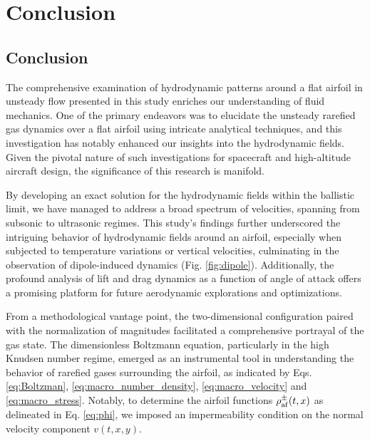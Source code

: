 \chapter{Conclusion}
\section{Conclusion}

The comprehensive examination of hydrodynamic patterns around a flat airfoil in unsteady flow presented in this study enriches our understanding of fluid mechanics. One of the primary endeavors was to elucidate the unsteady rarefied gas dynamics over a flat airfoil using intricate analytical techniques, and this investigation has notably enhanced our insights into the hydrodynamic fields. Given the pivotal nature of such investigations for spacecraft and high-altitude aircraft design, the significance of this research is manifold.

By developing an exact solution for the hydrodynamic fields within the ballistic limit, we have managed to address a broad spectrum of velocities, spanning from subsonic to ultrasonic regimes. This study's findings further underscored the intriguing behavior of hydrodynamic fields around an airfoil, especially when subjected to temperature variations or vertical velocities, culminating in the observation of dipole-induced dynamics (Fig. \ref{fig:dipole}). Additionally, the profound analysis of lift and drag dynamics as a function of angle of attack offers a promising platform for future aerodynamic explorations and optimizations.

From a methodological vantage point, the two-dimensional configuration paired with the normalization of magnitudes facilitated a comprehensive portrayal of the gas state. The dimensionless Boltzmann equation, particularly in the high Knudsen number regime, emerged as an instrumental tool in understanding the behavior of rarefied gases surrounding the airfoil, as indicated by Eqs. \ref{eq:Boltzman}, \ref{eq:macro_number_density}, \ref{eq:macro_velocity} and \ref{eq:macro_stress}. Notably, to determine the airfoil functions $\rho_{\mathrm{af}}^\pm(t,x)$ as delineated in Eq. \ref{eq:phi}, we imposed an impermeability condition on the normal velocity component $v(t,x,y)$.

